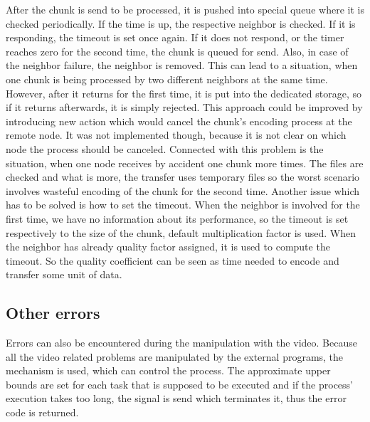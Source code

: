 After the chunk is send to be processed, it is pushed into special queue
where it is checked periodically. If the time is up, the respective
neighbor is checked. If it is responding, the timeout is set once again.
If it does not respond, or the timer reaches zero for the second time,
the chunk is queued for send. Also, in case of the neighbor failure, the
neighbor is removed. This can lead to a situation, when one chunk is
being processed by two different neighbors at the same time. However,
after it returns for the first time, it is put into the dedicated
storage, so if it returns afterwards, it is simply rejected. This
approach could be improved by introducing new action which would cancel
the chunk's encoding process at the remote node. It was not implemented
though, because it is not clear on which node the process should be
canceled. Connected with this problem is the situation, when one node
receives by accident one chunk more times. The files are checked and
what is more, the transfer uses temporary files so the worst scenario
involves wasteful encoding of the chunk for the second time. Another
issue which has to be solved is how to set the timeout. When the
neighbor is involved for the first time, we have no information about
its performance, so the timeout is set respectively to the size of the
chunk, default multiplication factor is used. When the neighbor has
already quality factor assigned, it is used to compute the timeout. So
the quality coefficient can be seen as time needed to encode and
transfer some unit of data.

\subsection*{Other errors}

Errors can also be encountered during the manipulation with the video.
Because all the video related problems are manipulated by the external
programs, the mechanism is used, which can control the process. The
approximate upper bounds are set for each task that is supposed to be
executed and if the process' execution takes too long, the signal is
send which terminates it, thus the error code is returned.
